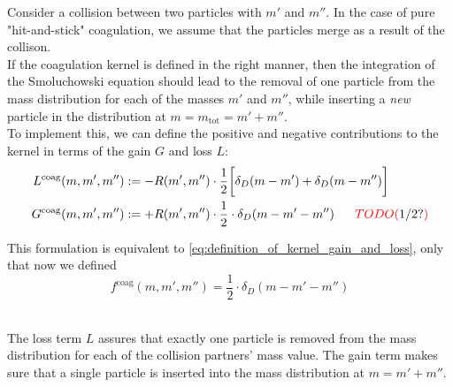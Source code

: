
    Consider a collision between two particles with $m'$ and $m''$. 
    In the case of pure "hit-and-stick" coagulation, 
    we assume that the particles merge as a result of the collison. \\

    If the coagulation kernel is defined in the right manner, then the integration of 
    the Smoluchowski equation should lead to the removal of one particle from the 
    mass distribution for each of the masses $m'$ and $m''$, while inserting a 
    \textit{new} particle in the distribution at $m=m_\text{tot}=m'+m''$. \\

    To implement this, we can define the positive and negative 
    contributions to the kernel in terms of the gain $G$ and loss $L$:
    \begin{align}
        \label{eq:definition_of_coagulation_kernel_gain_and_loss}
        L^\text{coag}(m, m', m'') 
            &:= -R(m',m'') \cdot \frac{1}{2} \bigg[\delta_D(m-m')+\delta_D(m-m'')\bigg] \\
        G^\text{coag}(m, m', m'') 
            &:= +R(m',m'') \cdot \frac{1}{2} \cdot \delta_D(m-m'-m'')
            \ \ \ \ \ \textcolor{red}{TODO(}1/2?\textcolor{red}{)}
    \end{align}

    This formulation is equivalent to \cref{eq:definition_of_kernel_gain_and_loss},
    only that now we defined 
    \begin{equation}
        f^\text{coag}(m,m',m'') = \frac{1}{2} \cdot \delta_D(m-m'-m'')
    \end{equation}

     \\

    The loss term $L$ assures that exactly one particle is removed from the mass 
    distribution for each of the collision partners' mass value.
    The gain term makes sure that a single particle is inserted into the 
    mass distribution at $m=m'+m''$. \\



